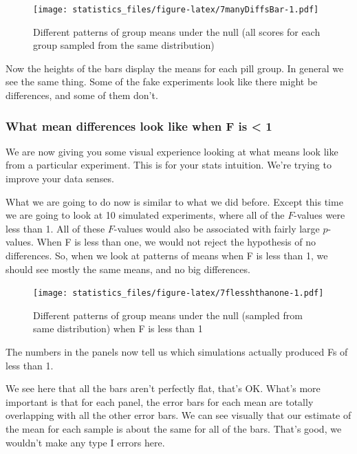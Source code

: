 \documentclass[]{book}
\begin{document}
\begin{figure}
\centering
\texttt{[image: statistics\_files/figure-latex/7manyDiffsBar-1.pdf]}
\caption{\label{fig:7manyDiffsBar}Different patterns of group means under the null (all scores for each group sampled from the same distribution)}
\end{figure}

Now the heights of the bars display the means for each pill group. In general we see the same thing. Some of the fake experiments look like there might be differences, and some of them don't.

\hypertarget{what-mean-differences-look-like-when-f-is-1}{%
\subsubsection{What mean differences look like when F is \textless{} 1}\label{what-mean-differences-look-like-when-f-is-1}}

We are now giving you some visual experience looking at what means look like from a particular experiment. This is for your stats intuition. We're trying to improve your data senses.

What we are going to do now is similar to what we did before. Except this time we are going to look at 10 simulated experiments, where all of the \(F\)-values were less than 1. All of these \(F\)-values would also be associated with fairly large \(p\)-values. When F is less than one, we would not reject the hypothesis of no differences. So, when we look at patterns of means when F is less than 1, we should see mostly the same means, and no big differences.

\begin{figure}
\centering
\texttt{[image: statistics\_files/figure-latex/7flesshthanone-1.pdf]}
\caption{\label{fig:7flesshthanone}Different patterns of group means under the null (sampled from same distribution) when F is less than 1}
\end{figure}

The numbers in the panels now tell us which simulations actually produced Fs of less than 1.

We see here that all the bars aren't perfectly flat, that's OK. What's more important is that for each panel, the error bars for each mean are totally overlapping with all the other error bars. We can see visually that our estimate of the mean for each sample is about the same for all of the bars. That's good, we wouldn't make any type I errors here.
\end{document}
